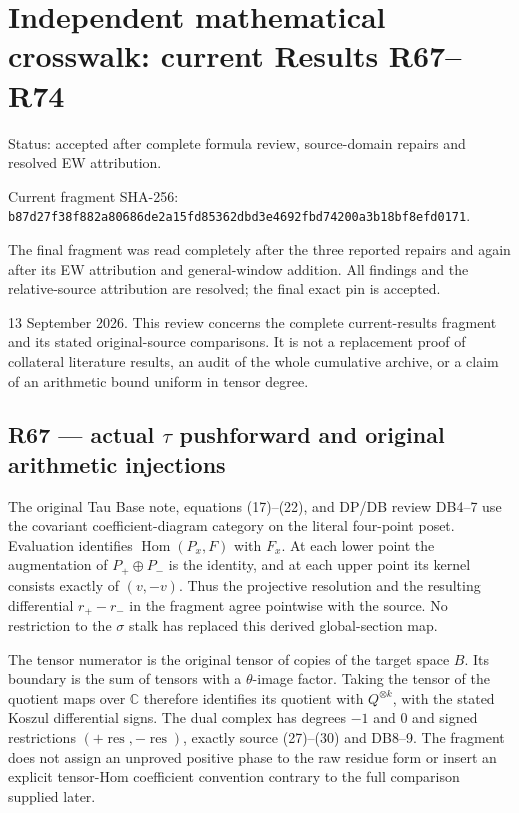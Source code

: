 \section{Independent mathematical crosswalk: current Results
R67--R74}\label{independent-mathematical-crosswalk-current-results-r67r74}

Status: accepted after complete formula review, source-domain repairs
and resolved EW attribution.

Current fragment SHA-256:
\nolinkurl{b87d27f38f882a80686de2a15fd85362dbd3e4692fbd74200a3b18bf8efd0171}.

The final fragment was read completely after the three reported repairs
and again after its EW attribution and general-window addition. All
findings and the relative-source attribution are resolved; the final
exact pin is accepted.

13 September 2026. This review concerns the complete current-results
fragment and its stated original-source comparisons. It is not a
replacement proof of collateral literature results, an audit of the
whole cumulative archive, or a claim of an arithmetic bound uniform in
tensor degree.

\subsection{\texorpdfstring{R67 --- actual \(\tau\) pushforward and
original arithmetic
injections}{R67 --- actual \textbackslash tau pushforward and original arithmetic injections}}\label{r67-actual-tau-pushforward-and-original-arithmetic-injections}

The original Tau Base note, equations (17)--(22), and DP/DB review
DB4--7 use the covariant coefficient-diagram category on the literal
four-point poset. Evaluation identifies \(\operatorname{Hom}(P_x,F)\)
with \(F_x\). At each lower point the augmentation of \(P_+\oplus P_-\)
is the identity, and at each upper point its kernel consists exactly of
\((v,-v)\). Thus the projective resolution and the resulting
differential \(r_+-r_-\) in the fragment agree pointwise with the
source. No restriction to the \(\sigma\) stalk has replaced this derived
global-section map.

The tensor numerator is the original tensor of copies of the target
space \(B\). Its boundary is the sum of tensors with a \(\theta\)-image
factor. Taking the tensor of the quotient maps over \(\mathbb C\)
therefore identifies its quotient with \(Q^{\otimes k}\), with the
stated Koszul differential signs. The dual complex has degrees \(-1\)
and 0 and signed restrictions
\((+\operatorname{res},-\operatorname{res})\), exactly source (27)--(30)
and DB8--9. The fragment does not assign an unproved positive phase to
the raw residue form or insert an explicit tensor-Hom coefficient
convention contrary to the full comparison supplied later.

